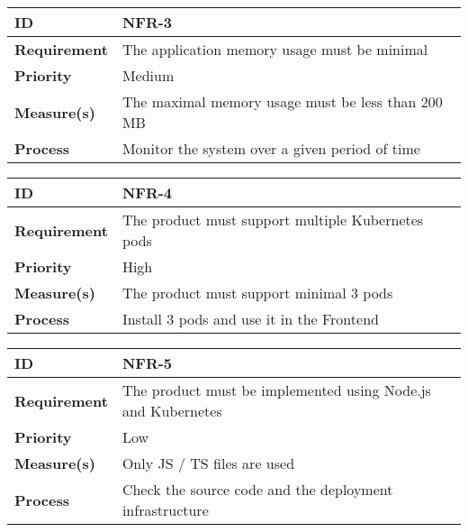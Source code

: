 \begin{center}
\begin{tabular}{ | m{8em} | m{25em}| } 
 \hline
 \textbf{ID} & NFR-3\\ 
 \hline
 \textbf{Requirement} & The application memory usage must be minimal\\
 \hline
 \textbf{Priority} & Medium\\
 \hline
 \textbf{Measure(s)} & The maximal memory usage must be less than 200 MB\\
 \hline
 \textbf{Process} & Monitor the system over a given period of time\\
 \hline
\end{tabular}
\end{center}

\begin{center}
\begin{tabular}{ | m{8em} | m{25em}| } 
 \hline
 \textbf{ID} & NFR-4\\ 
 \hline
 \textbf{Requirement} & The product must support multiple Kubernetes pods\\
 \hline
 \textbf{Priority} & High\\
 \hline
 \textbf{Measure(s)} & The product must support minimal 3 pods\\
 \hline
 \textbf{Process} & Install 3 pods and use it in the Frontend\\
 \hline
\end{tabular}
\end{center}

\begin{center}
\begin{tabular}{ | m{8em} | m{25em}| } 
 \hline
 \textbf{ID} & NFR-5\\ 
 \hline
 \textbf{Requirement} & The product must be implemented using Node.js and Kubernetes\\
 \hline
 \textbf{Priority} & Low\\
 \hline
 \textbf{Measure(s)} & Only JS / TS files are used\\
 \hline
 \textbf{Process} & Check the source code and the deployment infrastructure\\
 \hline
\end{tabular}
\end{center}


